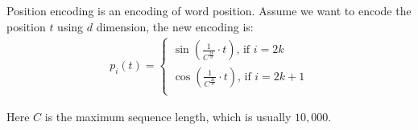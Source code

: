 \begin{definition}
    Position encoding is an encoding of word position. Assume we want to encode the position $t$ using $d$ dimension, the new encoding is:
    \begin{equation}
        \begin{aligned}
            p_i (t) = \begin{cases}
            \displaystyle \sin\left(\frac{1}{C^{\frac{2k}{d}}} \cdot t \right)  \textrm{, if }  i = 2k \\
            \displaystyle \cos\left(\frac{1}{C^{\frac{2k}{d}}} \cdot t \right)  \textrm{, if }  i = 2k +1 \\
            \end{cases}
        \end{aligned}        
    \end{equation}
    
    Here $C$ is the maximum sequence length, which is usually $10,000$.
\end{definition}








































































